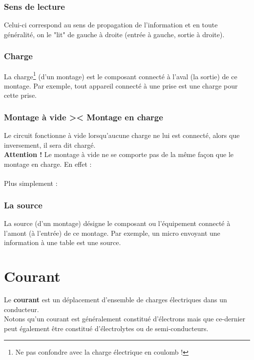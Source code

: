 \documentclass[british,french,11pt, a4paper, openany]{book}
\begin{document}
		\subsubsection{Sens de lecture}
		Celui-ci correspond au sens de propagation de l'information et en toute généralité, on le "lit" de gauche à droite (entrée à gauche, sortie à droite).
		
		\subsubsection{Charge}
		La charge\footnote{Ne pas confondre avec la charge électrique en coulomb !} (d'un montage) est le composant connecté à l'aval (la sortie) de ce montage. Par exemple, tout appareil connecté à une prise est une charge pour cette prise.
		
		\subsubsection{Montage à vide >< Montage en charge}
		Le circuit fonctionne à vide lorsqu'aucune charge ne lui est connecté, alors que inversement, il sera dit chargé.\\
		\textbf{Attention !} Le montage à vide ne se comporte pas de la même façon que le montage en charge. En effet :\\
		\ \\
		
		Plus simplement : \\
		
		\subsubsection{La source}
		La source (d'un montage) désigne le composant ou l'équipement connecté à l'amont (à l'entrée) de ce montage. Par exemple, un micro envoyant une information à une table est une source.
		
		
		\section{Courant}
		Le \textbf{courant} est un déplacement d'ensemble de charges électriques dans un conducteur.\\
		Notons qu'un courant est généralement constitué d'électrons mais que ce-dernier peut également être constitué d'électrolytes ou de semi-conducteurs.
		
\end{document}
